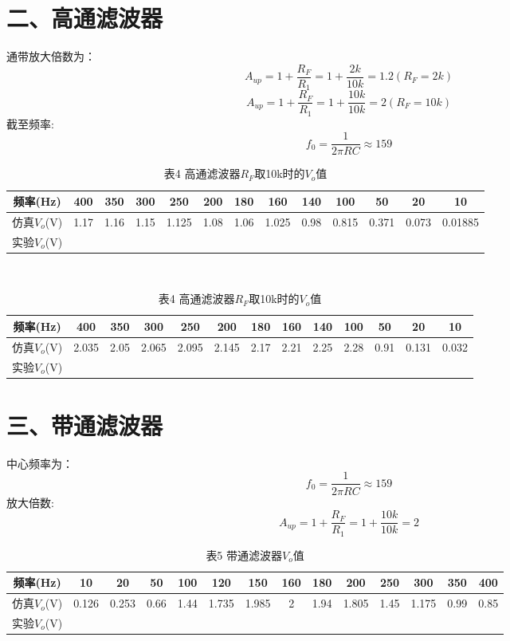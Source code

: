 \documentclass[a4paper,10pt,notitlepage]{article}
\begin{document}
	\section*{二、高通滤波器}
	通带放大倍数为：
	$$A_{up}=1+\frac{R_F}{R_1}=1+\frac{2k}{10k}=1.2(R_F=2k)$$
	$$A_{up}=1+\frac{R_F}{R_1}=1+\frac{10k}{10k}=2(R_F=10k)$$
	截至频率:
	$$f_0=\frac{1}{2\pi RC}\approx 159$$
	\begin{table}[h]
		\begin{minipage}{0.3\textwidth}
			\centering
			\begin{tabular}{|c|c|c|c|c|c|c|c|c|c|c|c|c|}
				\hline
				频率(Hz) & 400 & 350 & 300 & 250 & 200 & 180 & 160 & 140 & 100 & 50 & 20 & 10 \\
				\hline
				仿真$V_o$(V) & 1.17 & 1.16 & 1.15 & 1.125 & 1.08 & 1.06 & 1.025 & 0.98 & 0.815 & 0.371 & 0.073 & 0.01885\\
				\hline 
				实验$V_o$(V) & \qquad & \qquad & \qquad & \qquad & \qquad & \qquad & \qquad & \qquad & \qquad & \qquad & \qquad & \qquad \\
				\hline
			\end{tabular}
			\caption*{表3 高通滤波器$R_F$取2k时的$V_o$值}
		\end{minipage}
		\\
		\begin{minipage}{0.3\textwidth}
			\centering
			\begin{tabular}{|c|c|c|c|c|c|c|c|c|c|c|c|c|}
				\hline
				频率(Hz) & 400 & 350 & 300 & 250 & 200 & 180 & 160 & 140 & 100 & 50 & 20 & 10 \\
				\hline
				仿真$V_o$(V) & 2.035 & 2.05 & 2.065 & 2.095 & 2.145 & 2.17 & 2.21 & 2.25 & 2.28 & 0.91 & 0.131 & 0.032 \\
				\hline 
				实验$V_o$(V) & \qquad & \qquad & \qquad & \qquad & \qquad & \qquad & \qquad & \qquad & \qquad & \qquad & \qquad & \qquad \\
				\hline
			\end{tabular}
			\caption*{表4 高通滤波器$R_F$取10k时的$V_o$值}
		\end{minipage}
	\end{table}
	\section*{三、带通滤波器}
	中心频率为：
	$$f_0=\frac{1}{2\pi RC}\approx 159$$
	放大倍数:
	$$A_{up}=1+\frac{R_F}{R_1}=1+\frac{10k}{10k}=2$$
	\begin{table}[h]
		\centering
		\begin{tabular}{|c|c|c|c|c|c|c|c|c|c|c|c|c|c|}
			\hline
			频率(Hz) & 10 & 20 & 50 & 100 & 120 & 150 & 160 & 180 & 200 & 250 & 300 & 350 & 400 \\
			\hline
			仿真$V_o$(V) & 0.126 & 0.253 & 0.66 & 1.44 & 1.735 & 1.985 & 2 & 1.94 & 1.805 & 1.45 & 1.175 & 0.99 & 0.85 \\
			\hline 
			实验$V_o$(V) & \qquad & \qquad & \qquad & \qquad & \qquad & \qquad & \qquad & \qquad & \qquad & \qquad & \qquad & \qquad & \qquad \\
			\hline
		\end{tabular}
		\caption*{表5 带通滤波器$V_o$值}
	\end{table}
\end{document}
